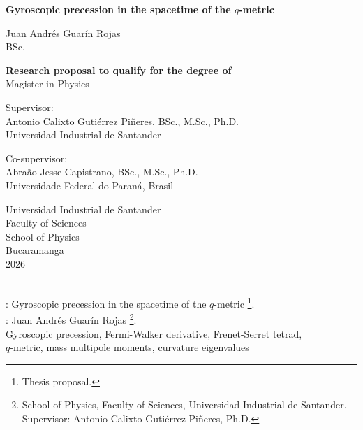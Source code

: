 \documentclass[12pt]{article}
\begin{document}
\thispagestyle{empty}
\begin{center}
	\Large{\bf Gyroscopic precession in the spacetime of the $q$-metric} \\
	\vspace{1.7cm}
	
	{\large Juan Andrés Guarín Rojas}\\
	{\large BSc.}
	\vspace{1.7cm}

	{\large \bf Research proposal to qualify for the degree of}\\
	{\large Magister in Physics} \\
	\vspace{1.7cm}

	{\large Supervisor:} \\
	{\large Antonio Calixto Gutiérrez Piñeres,  
         BSc., M.Sc., Ph.D.}\\
	{\large Universidad Industrial de Santander}
	\vspace{1.6cm}

	{\large Co-supervisor:} \\
	{\large Abraão Jesse Capistrano, 
	 BSc., M.Sc., Ph.D.}\\
	{\large Universidade Federal do Paran\'{a}, Brasil}
	\vspace{1.6cm}

	\vfill
	{\large Universidad Industrial de Santander}\\
	{\large Faculty of Sciences}\\
	{\large School of Physics}\\
	{\large Bucaramanga}\\
	{\large 2026}
\end{center}
\newpage

 \\

\vspace{0.1cm}
: Gyroscopic precession in the spacetime of the $q$-metric \footnote{Thesis proposal.}.\\

: Juan Andrés Guarín Rojas \footnote{School of Physics, Faculty of Sciences, Universidad Industrial de Santander. Supervisor: Antonio Calixto Gutiérrez Piñeres, Ph.D. }.\\

 Gyroscopic precession, Fermi-Walker derivative, Frenet-Serret tetrad,\\ $q$-metric, mass multipole moments, curvature eigenvalues\\
\end{document}

